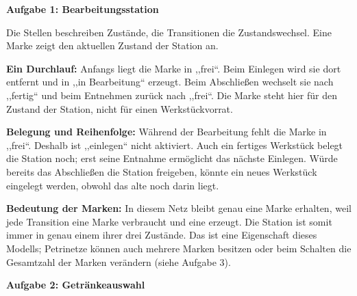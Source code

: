 \ifloesung{\clearpage}
\begin{loesung}
\textbf{Aufgabe 1: Bearbeitungsstation}

Die Stellen beschreiben Zustände, die Transitionen die Zustandswechsel.
Eine Marke zeigt den aktuellen Zustand der Station an.
\begin{center}
\end{center}

\textbf{Ein Durchlauf:} Anfangs liegt die Marke in ,,frei``. Beim Einlegen
wird sie dort entfernt und in ,,in Bearbeitung`` erzeugt. Beim Abschließen
wechselt sie nach ,,fertig`` und beim Entnehmen zurück nach ,,frei``.
Die Marke steht hier für den Zustand der Station, nicht für einen Werkstückvorrat.

\textbf{Belegung und Reihenfolge:} Während der Bearbeitung fehlt die Marke
in ,,frei``. Deshalb ist ,,einlegen`` nicht aktiviert. Auch ein fertiges Werkstück
belegt die Station noch; erst seine Entnahme ermöglicht das nächste Einlegen.
Würde bereits das Abschließen die Station freigeben, könnte ein neues Werkstück
eingelegt werden, obwohl das alte noch darin liegt.

\textbf{Bedeutung der Marken:} In diesem Netz bleibt genau eine Marke erhalten,
weil jede Transition eine Marke verbraucht und eine erzeugt. Die Station ist
somit immer in genau einem ihrer drei Zustände. Das ist eine Eigenschaft dieses
Modells; Petrinetze können auch mehrere Marken besitzen oder beim Schalten
die Gesamtzahl der Marken verändern (siehe Aufgabe 3).

\clearpage
\textbf{Aufgabe 2: Getränkeauswahl}


\end{loesung}
